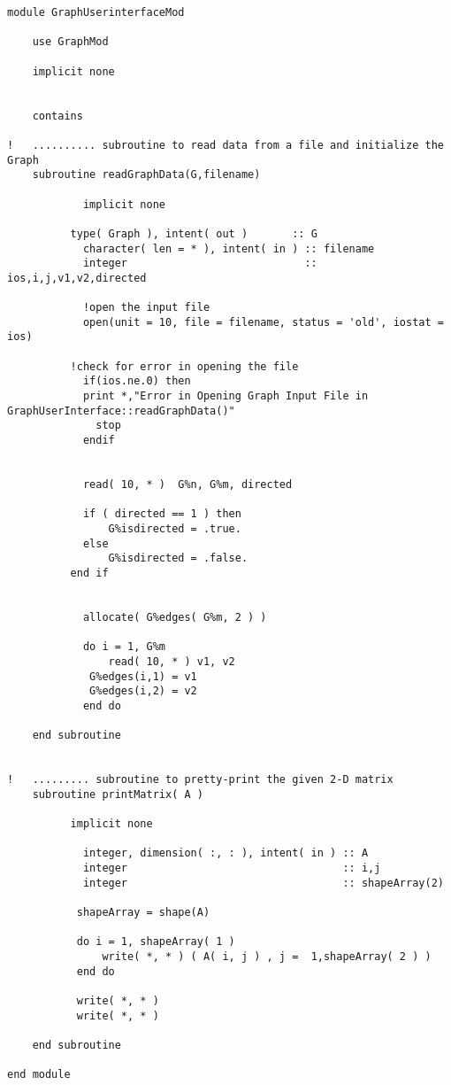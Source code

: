 \documentclass[10pt,a4paper,margin = 1.25cm]{article}
\begin{document}
\begin{lstlisting}
module GraphUserinterfaceMod
    
    use GraphMod
    
    implicit none
    
    
    contains
    
!   .......... subroutine to read data from a file and initialize the Graph 
    subroutine readGraphData(G,filename)
     
    		implicit none
    
   		  type( Graph ), intent( out )       :: G  
    		character( len = * ), intent( in ) :: filename
    		integer                            :: ios,i,j,v1,v2,directed
    
		    !open the input file
    		open(unit = 10, file = filename, status = 'old', iostat = ios)
    		
   		  !check for error in opening the file
    		if(ios.ne.0) then
      	    print *,"Error in Opening Graph Input File in GraphUserInterface::readGraphData()"
      		  stop
    		endif
    
    		
    		read( 10, * )  G%n, G%m, directed
    		
    		if ( directed == 1 ) then
      			G%isdirected = .true.
    		else 
      			G%isdirected = .false.
   		  end if
    
  
    		allocate( G%edges( G%m, 2 ) )

    		do i = 1, G%m
        		read( 10, * ) v1, v2
       		 G%edges(i,1) = v1
       		 G%edges(i,2) = v2
    		end do
  
    end subroutine


!   ......... subroutine to pretty-print the given 2-D matrix
    subroutine printMatrix( A ) 
  
  		  implicit none
  		  
    		integer, dimension( :, : ), intent( in ) :: A
    		integer                                  :: i,j
    		integer                                  :: shapeArray(2)
  
 		   shapeArray = shape(A)
  
 		   do i = 1, shapeArray( 1 )
 		       write( *, * ) ( A( i, j ) , j =  1,shapeArray( 2 ) )
 		   end do
 		   
 		   write( *, * )
 		   write( *, * )
  
    end subroutine

end module     
\end{lstlisting}
\end{document}
